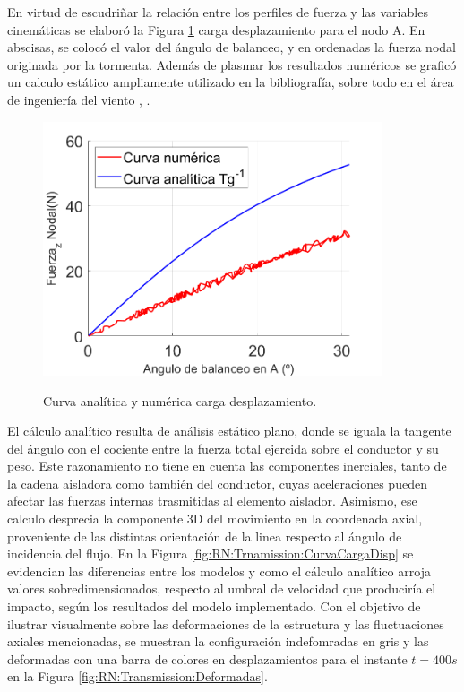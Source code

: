 En virtud de escudriñar la relación entre los perfiles de fuerza y las variables cinemáticas se elaboró la Figura \ref{fig:RN:Trnsmission:CurvaCargaDisp} carga desplazamiento para el nodo A. En abscisas, se colocó el valor del ángulo de balanceo, y en ordenadas la fuerza nodal originada por la tormenta. Además de plasmar los resultados numéricos se graficó un calculo estático ampliamente utilizado en la bibliografía, sobre todo en el área de ingeniería del viento \citep{Stengel2017a}, \citep{duranona2009analysis} \citep{yang2016nonlinear}.


\begin{figure}[htbp]
	\centering
	\includegraphics[width=100mm]{./imagenes/ResultadosNumericos/TransmissionTormenta/FuerzaAngulo_TS.png}
	\label{fig:RN:Trnsmission:CurvaCargaDisp}
	\caption{Curva analítica y numérica carga desplazamiento.}
\end{figure}
 
 El cálculo analítico resulta de análisis estático plano, donde se iguala la tangente del ángulo con el cociente entre la fuerza total ejercida sobre el conductor y su peso. Este razonamiento no tiene en cuenta las componentes inerciales, tanto de la cadena aisladora como también del conductor, cuyas aceleraciones pueden afectar las fuerzas internas trasmitidas al elemento aislador. Asimismo, ese calculo desprecia la componente 3D del movimiento en la coordenada axial, proveniente de las distintas orientación de la linea respecto al ángulo de incidencia del flujo. En la Figura \ref{fig:RN:Trnamission:CurvaCargaDisp} se evidencian las diferencias entre los modelos y como el cálculo analítico arroja valores sobredimensionados, respecto al umbral de velocidad que produciría el impacto, según los resultados del modelo implementado. Con el objetivo de ilustrar visualmente sobre las deformaciones de la estructura y las fluctuaciones axiales mencionadas, se muestran la configuración indefomradas en gris y las deformadas con una barra de colores en desplazamientos para el instante $t=400 s$ en la Figura \ref{fig:RN:Transmission:Deformadas}.
 
